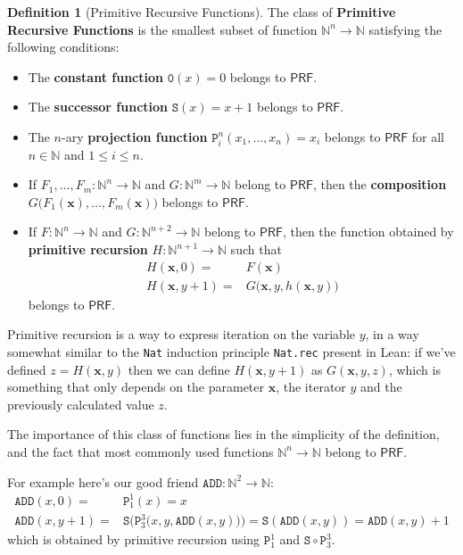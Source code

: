 \documentclass[oneside]{book}
\theoremstyle{definition}
\newtheorem{definition}{Definition}
\theoremstyle{remark}
\theoremstyle{plain}
\newcommand{\NN}{\mathbb{N}}
\newcommand{\PRF}{\mathsf{PRF}}
\newcommand{\prZero}{\mathtt{0}}
\newcommand{\prSucc}{\mathtt{S}}
\newcommand{\prProj}[2]{\mathtt{P}^{#1}_{#2}} %
\newcommand{\pradd}{\mathtt{ADD}}
\begin{document}
\begin{definition}[Primitive Recursive Functions]
The class of \textbf{Primitive Recursive Functions} is the smallest subset of function $\NN^n \to \NN$ satisfying the following conditions:
\begin{itemize}
\item The \textbf{constant function} $\prZero(x) = 0$ belongs to $\PRF$.
\item The \textbf{successor function} $\prSucc(x) = x+1$ belongs to $\PRF$.
\item The $n$-ary \textbf{projection function} $\prProj{n}{i}(x_1, \dots, x_n) = x_i$ belongs to $\PRF$
for all $n \in \NN$ and $1 \le i \le n$.
\item If $F_1, \dots, F_m : \NN^n \to \NN$ and $G : \NN^m \to \NN$ belong to $\PRF$,
then the \textbf{composition} $G \big( F_1(\boldsymbol{x}), \dots, F_m(\boldsymbol{x}) \big)$ belongs to $\PRF$.
\item If $F:\NN^n \to \NN$ and $G:\NN^{n+2} \to \NN$ belong to $\PRF$,
then the function obtained by \textbf{primitive recursion} $H:\NN^{n+1} \to \NN$ such that
\begin{align*}
  H(\boldsymbol{x}, 0)   = & F(\boldsymbol{x}) \\
  H(\boldsymbol{x}, y+1) = & G \big( \boldsymbol{x}, y, h(\boldsymbol{x}, y) \big)
\end{align*}
belongs to $\PRF$.
\end{itemize}
\end{definition}

Primitive recursion is a way to express iteration on the variable $y$,
in a way somewhat similar to the \lstinline{Nat} induction principle \lstinline{Nat.rec} present in Lean:
if we've defined $z=H(\boldsymbol{x},y)$ then we can define $H(\boldsymbol{x},y+1)$ as $G(\boldsymbol{x},y,z)$,
which is something that only depends on the parameter $\boldsymbol{x}$, the iterator $y$ and the previously calculated value $z$.

The importance of this class of functions lies in the simplicity of the definition,
and the fact that most commonly used functions $\NN^n \to \NN$ belong to $\PRF$.

For example here's our good friend $\pradd : \NN^2 \to \NN$:
\begin{align*}
  \pradd(x, 0)   = & \prProj{1}{1}(x) = x \\
  \pradd(x, y+1) = & \prSucc \big( \prProj{3}{3} \big( x,y,\pradd(x,y) \big) \big) = \prSucc(\pradd(x,y)) = \pradd(x,y)+1
\end{align*}
which is obtained by primitive recursion using $\prProj{1}{1}$ and $\prSucc \circ \prProj{3}{3}$.
\end{document}
